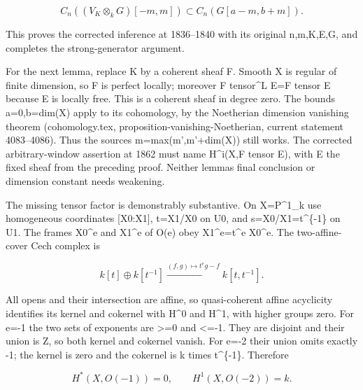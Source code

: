 \[
 C_n((V_K\otimes_k G)[-m,m])
       \subset C_n(G[a-m,b+m]).
\]

This proves the corrected inference at 1836–\allowbreak{}1840 with its original n,\allowbreak{}m,\allowbreak{}K,\allowbreak{}E,\allowbreak{}G,\allowbreak{} and completes the strong-generator argument.

For the next lemma,\allowbreak{} replace K by a coherent sheaf F. Smooth X is regular of finite dimension,\allowbreak{} so F is perfect locally; moreover F tensor\^{}L E\allowbreak{}=F tensor E because E is locally free. This is a coherent sheaf in degree zero. The bounds a\allowbreak{}=0,\allowbreak{}b\allowbreak{}=dim(X)\allowbreak{} apply to its cohomology,\allowbreak{} by the Noetherian dimension vanishing theorem (cohomology.tex,\allowbreak{} proposition-vanishing-Noetherian,\allowbreak{} current statement 4083–\allowbreak{}4086)\allowbreak{}. Thus the source\textquotesingle s m\allowbreak{}=max(m',\allowbreak{}m'\allowbreak{}+dim(X)\allowbreak{})\allowbreak{} still works. The corrected arbitrary-window assertion at 1862 must name H\textasciicircum{}i(X,\allowbreak{}F tensor E)\allowbreak{},\allowbreak{} with E the fixed sheaf from the preceding proof. Neither lemma\textquotesingle s final conclusion or dimension constant needs weakening.

The missing tensor factor is demonstrably substantive. On X\allowbreak{}=P\textasciicircum{}1\_\allowbreak{}k use homogeneous coordinates [X0:\allowbreak{}X1]\allowbreak{},\allowbreak{} t\allowbreak{}=X1/\allowbreak{}X0 on U0,\allowbreak{} and s\allowbreak{}=X0/\allowbreak{}X1\allowbreak{}=t\textasciicircum{}\{-1\} on U1. The frames X0\^{}e and X1\^{}e of O(e)\allowbreak{} obey X1\textasciicircum{}e\allowbreak{}=t\textasciicircum{}e X0\^{}e. The two-affine-cover Cech complex is

\[
 k[t]\oplus k[t^{-1}]
 \xrightarrow{(f,g)\mapsto t^e g-f}
 k[t,t^{-1}].
\]

All opens and their intersection are affine,\allowbreak{} so quasi-coherent affine acyclicity identifies its kernel and cokernel with H\^{}0 and H\textasciicircum{}1,\allowbreak{} with higher groups zero. For e\allowbreak{}=-1 the two sets of exponents are >\allowbreak{}=0 and <\allowbreak{}=-1. They are disjoint and their union is Z,\allowbreak{} so both kernel and cokernel vanish. For e\allowbreak{}=-2 their union omits exactly -1; the kernel is zero and the cokernel is k times t\^{}\{-1\}. Therefore

\[
 H^*(X,O(-1))=0,\qquad H^1(X,O(-2))=k.
\]

